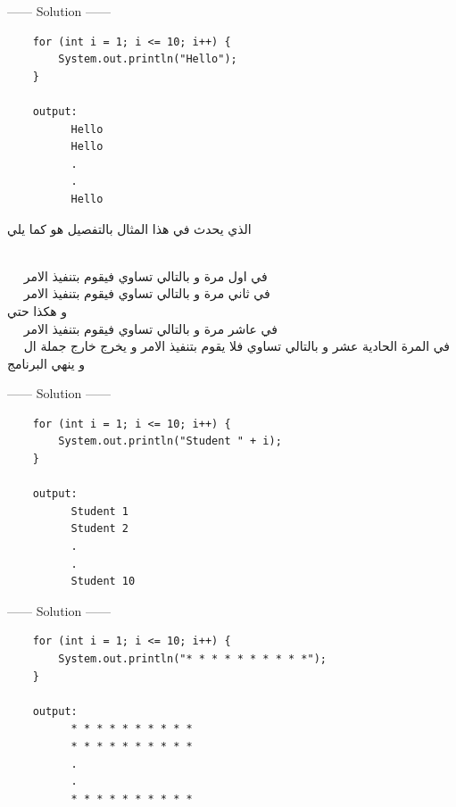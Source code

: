 \begin{example}
  \begin{center}
    ------ \textcolor{Solution}{Solution} ------ 
  \end{center} 

  \begin{verbatim}
    for (int i = 1; i <= 10; i++) {
        System.out.println("Hello");
    }

    output:
          Hello
          Hello
          .
          .
          Hello
  \end{verbatim}
\end{example}
\begin{AR}
  الذي يحدث في هذا المثال بالتفصيل هو كما يلي 

\\
\ \ \LR{\textcolor{theme}{•}}   في اول مرة  و بالتالي  تساوي  فيقوم بتنفيذ الامر 
\\
\ \ \LR{\textcolor{theme}{•}}   في ثاني مرة  و بالتالي  تساوي  فيقوم بتنفيذ الامر 
\\
و هكذا حتي 
\\
\ \ \LR{\textcolor{theme}{•}}   في عاشر مرة  و بالتالي  تساوي  فيقوم بتنفيذ الامر 
\\
\ \ \LR{\textcolor{theme}{•}}   في المرة الحادية عشر  و بالتالي  تساوي  فلا يقوم بتنفيذ الامر و يخرج خارج جملة ال  و ينهي البرنامج 
\end{AR}
\newpage
\begin{example}
  \begin{center}
    ------ \textcolor{Solution}{Solution} ------ 
  \end{center} 

  \begin{verbatim}
    for (int i = 1; i <= 10; i++) {
        System.out.println("Student " + i);
    }

    output:
          Student 1 
          Student 2
          .
          .
          Student 10
  \end{verbatim}
\end{example}
\begin{example}
  \begin{center}
    ------ \textcolor{Solution}{Solution} ------ 
  \end{center} 

  \begin{verbatim}
    for (int i = 1; i <= 10; i++) {
        System.out.println("* * * * * * * * * *");
    }

    output:
          * * * * * * * * * *
          * * * * * * * * * *
          .
          .
          * * * * * * * * * *
  \end{verbatim}
\end{example}
